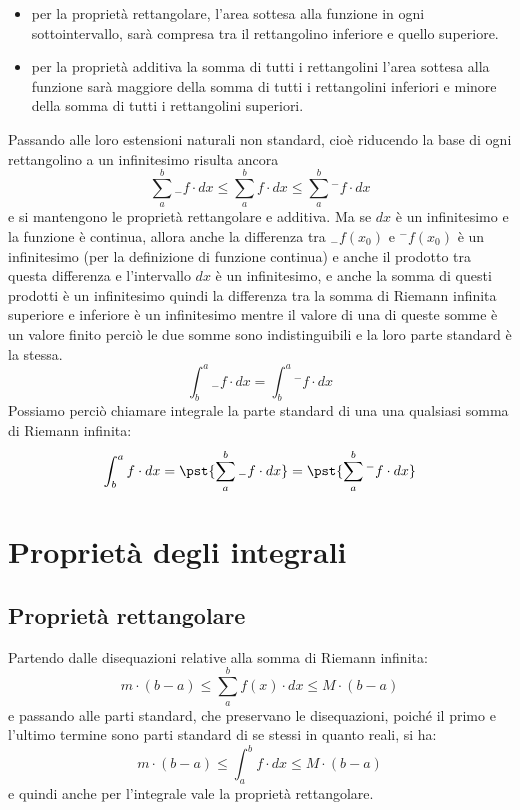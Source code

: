 \begin{itemize} [nosep]
 \item per la proprietà rettangolare, l'area sottesa alla funzione in ogni 
sottointervallo, sarà compresa tra il rettangolino inferiore e quello 
superiore.
 \item per la proprietà additiva la somma di tutti i rettangolini l'area 
sottesa alla funzione sarà maggiore della somma di tutti i rettangolini 
inferiori e minore della somma di tutti i rettangolini superiori.
\end{itemize}

  Passando alle loro estensioni naturali non standard, cioè riducendo la base 
di ogni rettangolino a un infinitesimo risulta ancora 
\[\sum_a^b {}_{-}f \cdot dx \le \sum_a^b f \cdot dx \le 
  \sum_a^b {}^{-}f \cdot dx\] 
e si mantengono le proprietà rettangolare e additiva. 
Ma se \(dx\) è un infinitesimo e la funzione è continua, allora anche la 
differenza tra \({}_{-}f(x_0)\) e \({}^{-}f(x_0)\) è un infinitesimo (per la 
definizione di funzione continua) e anche il prodotto tra questa differenza e 
l'intervallo \(dx\) è un infinitesimo, e anche la somma di questi prodotti è 
un infinitesimo quindi la differenza tra la somma di Riemann infinita 
superiore e inferiore è un infinitesimo mentre il valore di una di queste 
somme è un valore finito perciò le due somme sono indistinguibili e la loro 
parte standard è la stessa.
\[\int_b^a {}_{-}f \cdot dx = \int_b^a {}^{-}f \cdot dx\]
Possiamo perciò chiamare integrale la parte standard di una una qualsiasi 
somma di Riemann infinita:
\[\int_b^a f \cdot dx = \pst{\sum_a^b {}_{-}f \cdot dx} =
                        \pst{\sum_a^b {}^{-}f \cdot dx}\]

\section{Proprietà degli integrali}
\label{sec:integrali_proprieta}

\subsection{Proprietà rettangolare}
\label{subsec:integrali_proprieta_rettangolare}

Partendo dalle disequazioni relative alla somma di Riemann infinita:
\[m \cdot (b - a) \le  \sum_a^b f(x) \cdot dx  \le M\cdot(b - a)\]
e passando alle parti standard, che 
preservano le disequazioni, poiché il primo e l'ultimo termine sono parti 
standard di se stessi in quanto reali, si ha: 
\[m \cdot(b - a) \le  \int_a^b f \cdot dx  \le M\cdot(b - a)\] 
e quindi anche per l'integrale vale la proprietà rettangolare.


